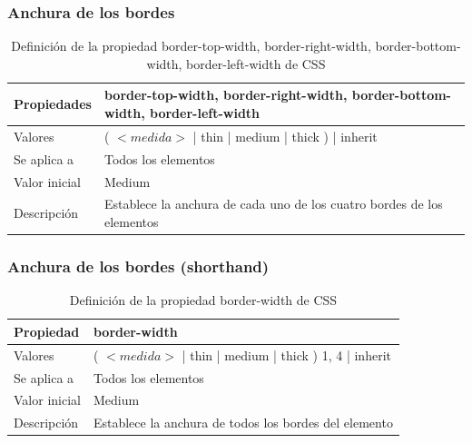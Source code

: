 
\begin{frame}
\frametitle{Anchura de los bordes}

\begin{center}
  \begin{table}
   \begin{tabular}{p{1.8cm}p{7.8cm}}
Propiedades &\bf{border-top-width}, \bf{border-right-width}, \bf{border-bottom-width}, \bf{border-left-width} \\ \hline
Valores & ( $<medida>$ | thin | medium | thick ) | inherit \\ \hline
Se aplica a & Todos los elementos \\ \hline
Valor inicial & Medium \\ \hline
Descripción & Establece la anchura de cada uno de los cuatro bordes de los elementos \\ \hline
  \end{tabular}
   \caption{Definición de la propiedad border-top-width, border-right-width, border-bottom-width, border-left-width de CSS}
 \end{table}
\end{center}

\end{frame}


\begin{frame}
\frametitle{Anchura de los bordes (shorthand)}

\begin{center}
  \begin{table}
   \begin{tabular}{p{1.8cm}p{7.8cm}}
Propiedad &\bf{border-width} \\ \hline
Valores & ( $<medida>$ | thin | medium | thick ) {1, 4} | inherit \\ \hline
Se aplica a & Todos los elementos \\ \hline
Valor inicial & Medium \\ \hline
Descripción & Establece la anchura de todos los bordes del elemento \\ \hline
  \end{tabular}
   \caption{Definición de la propiedad border-width de CSS}
 \end{table}
\end{center}

\end{frame}

